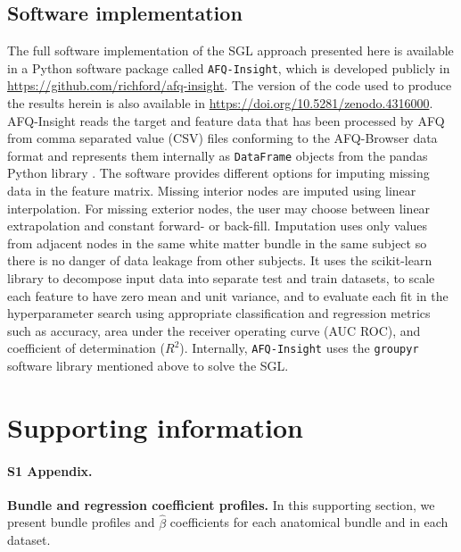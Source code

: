 \documentclass[10pt,letterpaper]{article}
\begin{document}
\subsection{Software implementation}

The full software implementation of the SGL approach presented here is available
in a Python software package called \texttt{AFQ-Insight}, which is developed
publicly in \url{https://github.com/richford/afq-insight}.
The version of the code used to produce the results herein is also available in
\url{https://doi.org/10.5281/zenodo.4316000}.
AFQ-Insight reads the target and feature data that has been processed by AFQ
from comma separated value (CSV) files conforming to the AFQ-Browser data
format \cite{yeatman2018browser} and represents them internally as
\lstinline{DataFrame} objects from the pandas Python library
\cite{mckinney2010data}. The software provides different options for imputing
missing data in the feature matrix. Missing interior nodes are imputed using
linear interpolation. For missing exterior nodes, the user may choose between
linear extrapolation and constant forward- or back-fill. Imputation uses only
values from adjacent nodes in the same white matter bundle in the same
subject so there is no danger of data leakage from other subjects. It uses
the scikit-learn \cite{scikit-learn} library to decompose input data into
separate test and train datasets, to scale each feature to have zero mean and
unit variance, and to evaluate each fit in the hyperparameter search using
appropriate classification and regression metrics such as accuracy, area
under the receiver operating curve (AUC ROC), and coefficient of
determination ($R^2$). Internally, \texttt{AFQ-Insight} uses the \texttt{groupyr} software library \cite{groupyr} mentioned above to solve the SGL.

\section*{Supporting information}

\paragraph*{S1 Appendix.}
\label{S1_Appendix}
{\bf Bundle and regression coefficient profiles.}
In this supporting section, we present bundle profiles and $\hat{\beta}$ coefficients
for each anatomical bundle and in each dataset.
\end{document}
